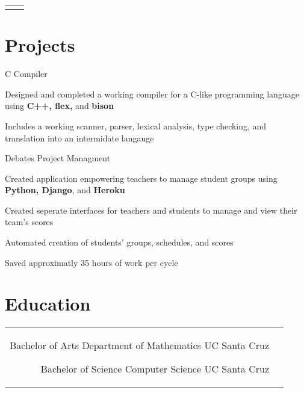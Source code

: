 \documentclass[10pt]{article}
\begin{document}
\begin{paracol}{2}
\begin{supertabular}{rl}

\end{supertabular}


\switchcolumn

\section{Projects}

{}{}
{C Compiler}{}
{
  \item Designed and completed a working compiler for a C-like programming language
    using \textbf{C++, flex,} and \textbf{bison}
  \item Includes a working scanner, parser, lexical analysis, type checking,
    and translation in\-to an intermidate langauge
}

{}{}
{Debates Project Managment}{}
{
  \item Created application empowering teachers to manage
    student groups using \textbf{Python, Django},
    and \textbf{Heroku}
  \item Created seperate interfaces for teachers and students to
    manage and view their team's scores
  \item Automated creation of students' groups, sche\-dules, and scores
  \item Saved approximatly 35 hours of work per cycle
}

\section{Education}

\begin{supertabular}{rl}
	{Bachelor of Arts}
	{}
    {Department of Mathematics}
	{UC Santa Cruz}

    {Bachelor of Science}
    {}
    {Computer Science}
    {UC Santa Cruz}

\end{supertabular}

\end{paracol}
\end{document}
